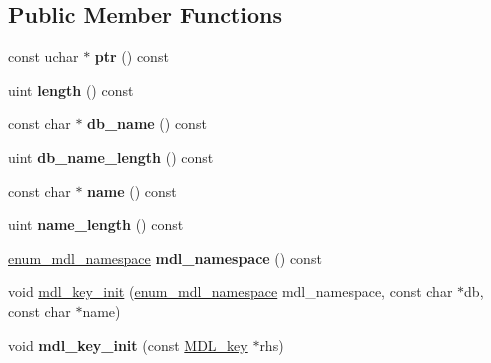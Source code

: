 \subsection*{Public Member Functions}
\begin{DoxyCompactItemize}
\item 
\mbox{\label{structMDL__key_a1b08a07c4e9650a662feabb466507404}} 
const uchar $\ast$ {\bfseries ptr} () const
\item 
\mbox{\label{structMDL__key_a5f901f5163e7887d1e482241e4813f9e}} 
uint {\bfseries length} () const
\item 
\mbox{\label{structMDL__key_a6d996da020bfc9851710b4ca44f30d51}} 
const char $\ast$ {\bfseries db\+\_\+name} () const
\item 
\mbox{\label{structMDL__key_a15208204dd28afcfc756941b368b236a}} 
uint {\bfseries db\+\_\+name\+\_\+length} () const
\item 
\mbox{\label{structMDL__key_adf33ece720f68e35f1439813694297e4}} 
const char $\ast$ {\bfseries name} () const
\item 
\mbox{\label{structMDL__key_a192c557333fbba426a4bc31eb59e084e}} 
uint {\bfseries name\+\_\+length} () const
\item 
\mbox{\label{structMDL__key_a3c7ad7b46384b15803aa0b77b3bd52f6}} 
\mbox{\hyperlink{structMDL__key_a391ec4bd98fec6852a48f7856546ed3b}{enum\+\_\+mdl\+\_\+namespace}} {\bfseries mdl\+\_\+namespace} () const
\item 
void \mbox{\hyperlink{structMDL__key_a3815fd610e5670602ecffd82b695d1e7}{mdl\+\_\+key\+\_\+init}} (\mbox{\hyperlink{structMDL__key_a391ec4bd98fec6852a48f7856546ed3b}{enum\+\_\+mdl\+\_\+namespace}} mdl\+\_\+namespace, const char $\ast$db, const char $\ast$name)
\item 
\mbox{\label{structMDL__key_a409fb8b6038ac18165d3d291373c0319}} 
void {\bfseries mdl\+\_\+key\+\_\+init} (const \mbox{\hyperlink{structMDL__key}{M\+D\+L\+\_\+key}} $\ast$rhs)
\item 
\mbox{\label{structMDL__key_a9f5a9fa542651ab35c4f9ee4f99846ee}} 

\end{DoxyCompactItemize}
